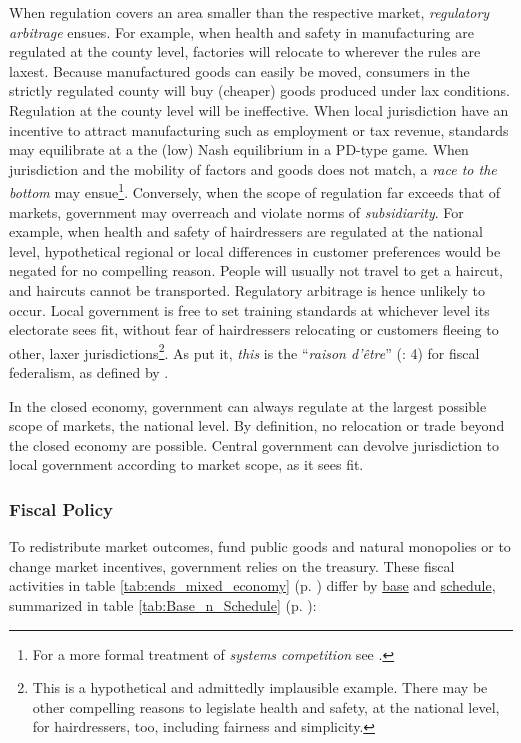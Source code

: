 \begin{description}
	When regulation covers an area smaller than the respective market, \emph{regulatory arbitrage} ensues. For example, when health and safety in manufacturing are regulated at the county level, factories will relocate to wherever the rules are laxest. Because manufactured goods can easily be moved, consumers in the strictly regulated county will buy (cheaper) goods produced under lax conditions. Regulation at the county level will be ineffective. When local jurisdiction have an incentive to attract manufacturing such as employment or tax revenue, standards may equilibrate at a the (low) Nash equilibrium in a \gls{PD}-type game. When jurisdiction and the mobility of factors and goods does not match, a \emph{race to the bottom} may ensue\footnote{
		For a more formal treatment of \emph{systems competition} see \cite{Sinn2004}.}. 
	Conversely, when the scope of regulation far exceeds that of markets, government may overreach and violate norms of \emph{subsidiarity}. For example, when health and safety of hairdressers are regulated at the national level, hypothetical regional or local differences in customer preferences would be negated for no compelling reason. People will usually not travel to get a haircut, and haircuts cannot be transported. Regulatory arbitrage is hence unlikely to occur. Local government is free to set training standards at whichever level its electorate sees fit, without fear of hairdressers relocating or customers fleeing to other, laxer jurisdictions\footnote{
		This is a hypothetical and admittedly implausible example. There may be other compelling reasons to legislate health and safety, at the national level, for hairdressers, too, including fairness and simplicity.}.
	As \citeauthor{Bordo2011} put it, \emph{this} is the ``\emph{raison d'\^{e}tre}'' (\citeyear{Bordo2011}: 4) for fiscal federalism, as defined by \cite{Oates1972}.

	In the closed economy, government can always regulate at the largest possible scope of markets, the national level. By definition, no relocation or trade beyond the closed economy are possible. Central government can devolve jurisdiction to local government according to market scope, as it sees fit.

\end{description}

\subsubsection[Fiscal Policy]{Fiscal Policy} \label{sec:fiscal}
To redistribute market outcomes, fund public goods and natural monopolies or to change market incentives, government relies on the treasury. These fiscal activities in table \ref{tab:ends_mixed_economy} (p. \pageref{tab:ends_mixed_economy}) differ by \hyperref[it:base]{base} and \hyperref[it:schedule]{schedule}, summarized in table \ref{tab:Base_n_Schedule} (p. \pageref{tab:Base_n_Schedule}):

